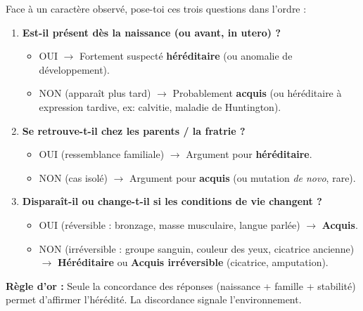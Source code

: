 \documentclass[11pt]{article}
\begin{document}
\begin{methode}
Face à un caractère observé, pose-toi ces trois questions dans l'ordre :
\begin{enumerate}
    \item \textbf{Est-il présent dès la naissance (ou avant, in utero) ?}
    \begin{itemize}
        \item OUI $\rightarrow$ Fortement suspecté \textbf{héréditaire} (ou anomalie de développement).
        \item NON (apparaît plus tard) $\rightarrow$ Probablement \textbf{acquis} (ou héréditaire à expression tardive, ex: calvitie, maladie de Huntington).
    \end{itemize}
    \item \textbf{Se retrouve-t-il chez les parents / la fratrie ?}
    \begin{itemize}
        \item OUI (ressemblance familiale) $\rightarrow$ Argument pour \textbf{héréditaire}.
        \item NON (cas isolé) $\rightarrow$ Argument pour \textbf{acquis} (ou mutation \emph{de novo}, rare).
    \end{itemize}
    \item \textbf{Disparaît-il ou change-t-il si les conditions de vie changent ?}
    \begin{itemize}
        \item OUI (réversible : bronzage, masse musculaire, langue parlée) $\rightarrow$ \textbf{Acquis}.
        \item NON (irréversible : groupe sanguin, couleur des yeux, cicatrice ancienne) $\rightarrow$ \textbf{Héréditaire} ou \textbf{Acquis irréversible} (cicatrice, amputation).
    \end{itemize}
\end{enumerate}
\par\textbf{Règle d'or :} Seule la concordance des réponses (naissance + famille + stabilité) permet d'affirmer l'hérédité. La discordance signale l'environnement.
\end{methode}
\end{document}
